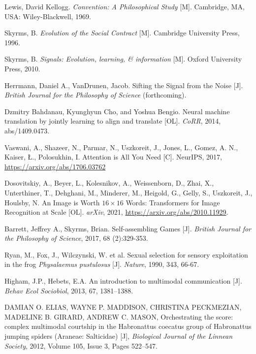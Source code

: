 \documentclass[12pt]{ctexart}  %
\begin{document}
\begin{thebibliography}{99}
\renewcommand{\baselinestretch}{1.0}  %
 Lewis, David Kellogg. \textit{Convention: A Philosophical Study} [M]. Cambridge, MA, USA: Wiley-Blackwell, 1969.

 Skyrms, B. \textit{Evolution of the Social Contract} [M]. Cambridge University Press, 1996.

 Skyrms, B. \textit{Signals: Evolution, learning, \& information} [M]. Oxford University Press, 2010.

 Herrmann, Daniel A., VanDrunen, Jacob. Sifting the Signal from the Noise [J]. \textit{British Journal for the Philosophy of Science} (forthcoming).

  Dzmitry Bahdanau, Kyunghyun Cho, and Yoshua Bengio. Neural machine translation by jointly learning to align and translate [OL]. \textit{CoRR}, 2014, abs/1409.0473.

 Vaswani, A., Shazeer, N., Parmar, N., Uszkoreit, J., Jones, L., Gomez, A. N., Kaiser, Ł., Polosukhin, I. Attention is All You Need [C]. NeurIPS, 2017, \url{https://arxiv.org/abs/1706.03762}

 Dosovitskiy, A., Beyer, L., Kolesnikov, A., Weissenborn, D., Zhai, X., Unterthiner, T., Dehghani, M., Minderer, M., Heigold, G., Gelly, S., Uszkoreit, J., Houlsby, N. An Image is Worth $16\times16$ Words: Transformers for Image Recognition at Scale [OL]. \textit{arXiv}, 2021, \url{https://arxiv.org/abs/2010.11929}.

 Barrett, Jeffrey A., Skyrms, Brian. Self-assembling Games [J]. \textit{British Journal for the Philosophy of Science}, 2017, 68 (2):329-353.

 Ryan, M., Fox, J., Wilczynski, W. et al. Sexual selection for sensory exploitation in the frog \textit{Physalaemus pustulosus} [J]. \textit{Nature}, 1990, 343, 66-67.

 Higham, J.P., Hebets, E.A. An introduction to multimodal communication [J]. \textit{Behav Ecol Sociobiol}, 2013, 67, 1381–1388.

 DAMIAN O. ELIAS, WAYNE P. MADDISON, CHRISTINA PECKMEZIAN, MADELINE B. GIRARD, ANDREW C. MASON, Orchestrating the score: complex multimodal courtship in the Habronattus coecatus group of Habronattus jumping spiders (Araneae: Salticidae) [J], \textit{Biological Journal of the Linnean Society}, 2012, Volume 105, Issue 3, Pages 522–547.


\end{thebibliography}
\end{document}

